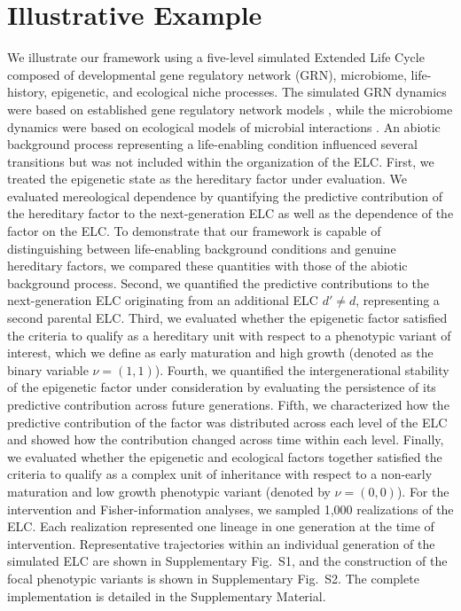 \documentclass[pdflatex,sn-mathphys-num]{sn-jnl}
\theoremstyle{thmstylethree}
\theoremstyle{thmstyleone}
\begin{document}
\section{Illustrative Example}
We illustrate our framework using a five-level simulated Extended Life Cycle composed of developmental gene regulatory network (GRN), microbiome, life-history, epigenetic, and ecological niche processes. The simulated GRN dynamics were based on established gene regulatory network models \cite{dejong2002modeling}, while the microbiome dynamics were based on ecological models of microbial interactions \cite{stein2013ecological,bucci2016mdsine}. An abiotic background process representing a life-enabling condition influenced several transitions but was not included within the organization of the ELC. First, we treated the epigenetic state as the hereditary factor under evaluation. We evaluated mereological dependence by quantifying the predictive contribution of the hereditary factor to the next-generation ELC as well as the dependence of the factor on the ELC. To demonstrate that our framework is capable of distinguishing between life-enabling background conditions and genuine hereditary factors, we compared these quantities with those of the abiotic background process. Second, we quantified the predictive contributions to the next-generation ELC originating from an additional ELC $d' \neq d$, representing a second parental ELC. Third, we evaluated whether the epigenetic factor satisfied the criteria to qualify as a hereditary unit with respect to a phenotypic variant of interest, which we define as early maturation and high growth (denoted as the binary variable $\nu = (1,1)$). Fourth, we quantified the intergenerational stability of the epigenetic factor under consideration by evaluating the persistence of its predictive contribution across future generations. Fifth, we characterized how the predictive contribution of the factor was distributed across each level of the ELC and showed how the contribution changed across time within each level. Finally, we evaluated whether the epigenetic and ecological factors together satisfied the criteria to qualify as a complex unit of inheritance with respect to a non-early maturation and low growth phenotypic variant (denoted by $\nu=(0,0)$). For the intervention and Fisher-information analyses, we sampled 1,000 realizations of the ELC. Each realization represented one lineage in one generation at the time of intervention. Representative trajectories within an individual generation of the simulated ELC are shown in Supplementary Fig.~S1, and the construction of the focal phenotypic variants is shown in Supplementary Fig.~S2. The complete implementation is detailed in the Supplementary Material.
\end{document}
